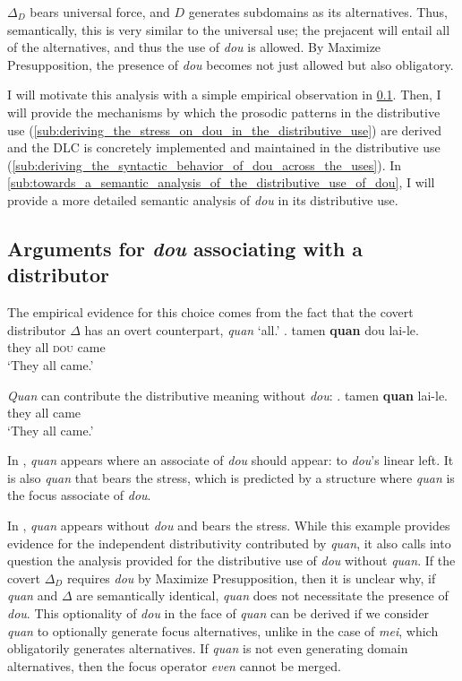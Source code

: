 \documentclass[12pt]{article}
\begin{document}
\(\Delta_D\) bears universal force, and \(D\) generates subdomains as its alternatives.
Thus, semantically, this is very similar to the universal use; the prejacent will entail all of the alternatives, and thus the use of \emph{dou} is allowed.
By Maximize Presupposition, the presence of \emph{dou} becomes not just allowed but also obligatory.

I will motivate this analysis with a simple empirical observation in \cref{sub:arguments_for_dou_associating_with_a_distributor}.
Then, I will provide the mechanisms by which the prosodic patterns in the distributive use (\cref{sub:deriving_the_stress_on_dou_in_the_distributive_use}) are derived and the DLC is concretely implemented and maintained in the distributive use (\cref{sub:deriving_the_syntactic_behavior_of_dou_across_the_uses}).
In \cref{sub:towards_a_semantic_analysis_of_the_distributive_use_of_dou}, I will provide a more detailed semantic analysis of \emph{dou} in its distributive use.




\subsection{Arguments for \emph{dou} associating with a distributor}
\label{sub:arguments_for_dou_associating_with_a_distributor}


The empirical evidence for this choice comes from the fact that the covert distributor \(\Delta\) has an overt counterpart, \emph{quan} `all.'
\ex. \gll
tamen \textbf{quan} dou lai-le. \\
they all \textsc{dou} came \\
\glt `They all came.'

\emph{Quan} can contribute the distributive meaning without \emph{dou}:
\ex. \gll
tamen \textbf{quan} lai-le. \\
they all came \\
\glt `They all came.' \label{itm:quan}

In \LLast, \emph{quan} appears where an associate of \emph{dou} should appear: to \emph{dou}'s linear left.
It is also \emph{quan} that bears the stress, which is predicted by a structure where \emph{quan} is the focus associate of \emph{dou}.

In \Last, \emph{quan} appears without \emph{dou} and bears the stress.
While this example provides evidence for the independent distributivity contributed by \emph{quan}, it also calls into question the analysis provided for the distributive use of \emph{dou} without \emph{quan}.
If the covert \(\Delta_D\) requires \emph{dou} by Maximize Presupposition, then it is unclear why, if \emph{quan} and \(\Delta\) are semantically identical, \emph{quan} does not necessitate the presence of \emph{dou}.
This optionality of \emph{dou} in the face of \emph{quan} can be derived if we consider \emph{quan} to optionally generate focus alternatives, unlike in the case of \emph{mei}, which obligatorily generates alternatives.
If \emph{quan} is not even generating domain alternatives, then the focus operator \emph{even} cannot be merged.
\end{document}
